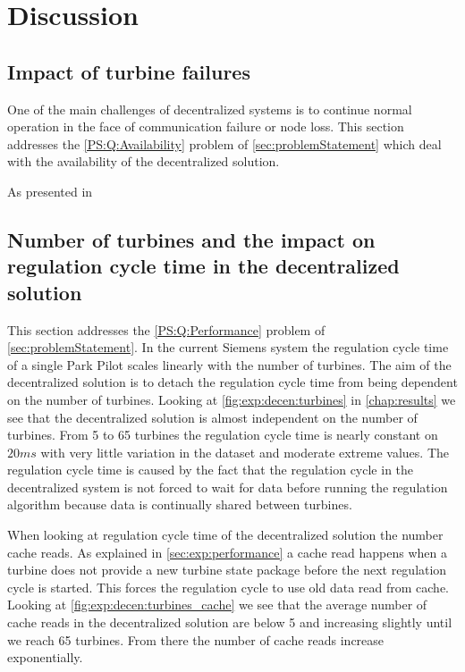 \chapter{Discussion}

\section{Impact of turbine failures}
One of the main challenges of decentralized systems is to continue normal operation in the face of communication failure or node loss. This section addresses the \ref{PS:Q:Availability} problem of \cref{sec:problemStatement} which deal with the availability of the decentralized solution.

As presented in

\section{Number of turbines and the impact on regulation cycle time in the decentralized solution}
\label{sec:disc:turbinesVScycletime}
This section addresses the \ref{PS:Q:Performance} problem of \cref{sec:problemStatement}. In the current Siemens system the regulation cycle time of a single Park Pilot scales linearly with the number of turbines.
The aim of the decentralized solution is to detach the regulation cycle time from being dependent on the number of turbines. 
Looking at \cref{fig:exp:decen:turbines} in \cref{chap:results} we see that the decentralized solution is almost independent on the number of turbines.
From 5 to 65 turbines the regulation cycle time is nearly constant on $20 ms$ with very little variation in the dataset and moderate extreme values.
The regulation cycle time is caused by the fact that the regulation cycle in the decentralized system is not forced to wait for data before running the regulation algorithm because data is continually shared between turbines.

When looking at regulation cycle time of the decentralized solution the number cache reads.
As explained in \cref{sec:exp:performance} a cache read happens when a turbine does not provide a new turbine state package before the next regulation cycle is started.
This forces the regulation cycle to use old data read from cache.
Looking at \cref{fig:exp:decen:turbines_cache} we see that the average number of cache reads in the decentralized solution are below 5 and increasing slightly until we reach 65 turbines. From there the number of cache reads increase exponentially.

